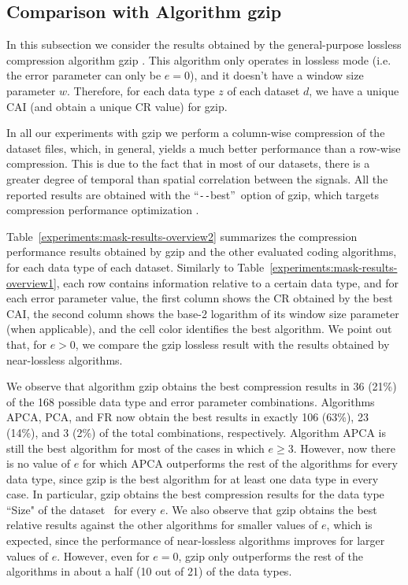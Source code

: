 
\subsection{Comparison with Algorithm gzip}
\label{secX:gzip}


\newcommand{\bestdash}{``\texttt{-{}-}best''}
In this subsection we consider the results obtained by the general-purpose lossless compression algorithm gzip \cite{gzip}. This algorithm only operates in lossless mode (i.e. the error parameter can only be $e=0$), and it doesn't have a window size parameter $w$. Therefore, for each data type $z$ of each dataset $d$, we have a unique CAI (and obtain a unique CR value) for gzip. 

In all our experiments with gzip we perform a column-wise compression of the dataset files, which, in general, yields a much better performance than a row-wise compression. This is due to the fact that in most of our datasets, there is a greater degree of temporal than spatial correlation between the signals. All the reported results are obtained with the \bestdash\ option of gzip, which targets compression performance optimization \cite{gzipman}. 


Table~\ref{experiments:mask-results-overview2} summarizes the compression performance results obtained by gzip and the other evaluated coding algorithms, for each data type of each dataset. Similarly to Table~\ref{experiments:mask-results-overview1}, each row contains information relative to a certain data type, and for each error parameter value, the first column shows the CR obtained by the best CAI, the second column shows the base-2 logarithm of its window size parameter (when applicable), and the cell color identifies the best algorithm. We point out that, for $e > 0$, we compare the gzip lossless result with the results obtained by near-lossless algorithms.


We observe that algorithm gzip obtains the best compression results in 36 (21\%) of the 168 possible data type and error parameter combinations. Algorithms APCA, PCA, and FR now obtain the best results in exactly 106 (63\%), 23 (14\%), and 3 (2\%) of the total combinations, respectively. Algorithm APCA is still the best algorithm for most of the cases in which $e \geq 3$. However, now there is no value of $e$ for which APCA outperforms the rest of the algorithms for every data type, since gzip is the best algorithm for at least one data type in every case. In particular, gzip obtains the best compression results for the data type ``Size" of the dataset \datasethail\ for every $e$. We also observe that gzip obtains the best relative results against the other algorithms for smaller values of $e$, which is expected, since the performance of near-lossless algorithms improves for larger values of $e$. However, even for $e=0$, gzip only outperforms the rest of the algorithms in about a half (10 out of 21) of the data types.


